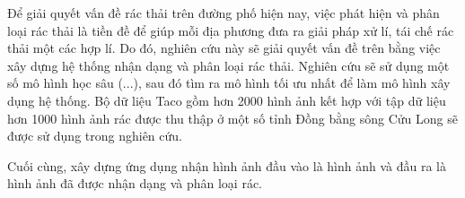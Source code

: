 \documentclass[./thesis.tex]{subfiles}
\begin{document}

{\fontsize{13}{12} \selectfont
Để giải quyết vấn đề rác thải trên đường phố hiện nay, việc phát hiện và phân loại rác thải là tiền đề để giúp mỗi địa phương đưa ra giải pháp xử lí, tái chế rác thải một các hợp lí. Do đó, nghiên cứu này sẽ giải quyết vấn đề trên bằng việc xây dựng hệ thống nhận dạng và phân loại rác thải. Nghiên cứu sẽ sử dụng một số mô hình học sâu (...), sau đó tìm ra mô hình tối ưu nhất để làm mô hình xây dụng hệ thống. Bộ dữ liệu Taco gồm hơn 2000 hình ảnh kết hợp với tập dữ liệu hơn 1000 hình ảnh rác được thu thập ở một số tỉnh Đồng bằng sông Cửu Long sẽ được sử dụng trong nghiên cứu.


Cuối cùng, xây dựng ứng dụng nhận hình ảnh đầu vào là hình ảnh và đầu ra là hình ảnh đã được nhận dạng và phân loại rác.
}
\bigskip

\end{document}

